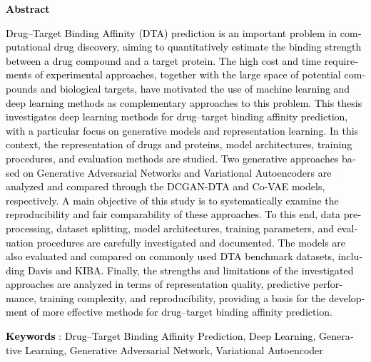 \thispagestyle{empty}

\begin{latin}
\vspace{-2cm}
\begin{center}
	\textbf{\large \textcolor{black}{Abstract} }
\end{center}


\textcolor{black}{
Drug–Target Binding Affinity (DTA) prediction is an important problem in computational drug discovery, aiming to quantitatively estimate the binding strength between a drug compound and a target protein. The high cost and time requirements of experimental approaches, together with the large space of potential compounds and biological targets, have motivated the use of machine learning and deep learning methods as complementary approaches to this problem.
This thesis investigates deep learning methods for drug–target binding affinity prediction, with a particular focus on generative models and representation learning. In this context, the representation of drugs and proteins, model architectures, training procedures, and evaluation methods are studied. Two generative approaches based on Generative Adversarial Networks and Variational Autoencoders are analyzed and compared through the DCGAN-DTA and Co-VAE models, respectively.
A main objective of this study is to systematically examine the reproducibility and fair comparability of these approaches. To this end, data preprocessing, dataset splitting, model architectures, training parameters, and evaluation procedures are carefully investigated and documented. The models are also evaluated and compared on commonly used DTA benchmark datasets, including Davis and KIBA. Finally, the strengths and limitations of the investigated approaches are analyzed in terms of representation quality, predictive performance, training complexity, and reproducibility, providing a basis for the development of more effective methods for drug–target binding affinity prediction.
}

\thispagestyle{empty} 
\hspace{-0.65cm}%
\textbf{\textcolor{black}{Keywords}} :
\textcolor{black}{Drug–Target Binding Affinity Prediction, Deep Learning, Generative Learning, Generative Adversarial Network, Variational Autoencoder}

\end{latin}


